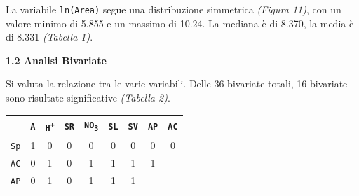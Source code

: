 \documentclass{article} %
\begin{document}
La variabile \texttt{ln(Area)} segue una distribuzione simmetrica \textit{(Figura 11)}, con un valore minimo di 5.855 e un massimo di 10.24. La mediana è di 8.370, la media è di 8.331 \textit{(Tabella 1)}.


\newpage
\begin{flushleft}
    \textbf{\Large 1.2 \: Analisi Bivariate}
    \vskip 10pt
\end{flushleft}
\vskip 10pt

Si valuta la relazione tra le varie variabili. Delle 36 bivariate totali, 16 bivariate sono risultate significative \textit{(Tabella 2)}.\\

\begin{table}[H]
    \centering
    \renewcommand{\arraystretch}{1.4} %
    \begin{tabular}{lcccccccc}
        \toprule
        & \texttt{A} & \texttt{H\textsuperscript{+}} & \texttt{SR} & \texttt{NO\textsubscript{3}} & \texttt{SL} & \texttt{SV} & \texttt{AP} & \texttt{AC} \\
        \midrule  
            \texttt{Sp} & 1 & 0 & 0 & 0 & 0 & 0 & 0 & 0 \\
            \texttt{AC} & 0 & 1 & 0 & 1 & 1 & 1 & 1 \\
            \texttt{AP} & 0 & 1 & 0 & 1 & 1 & 1 &  \\

\end{tabular}
\end{table}
\end{document}
